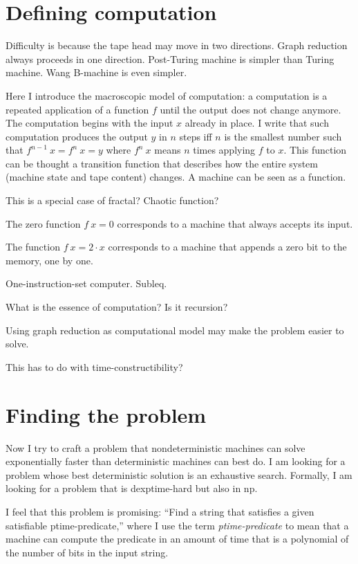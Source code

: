 \section{Defining computation}

Difficulty is because the tape head may move in two directions.
Graph reduction always proceeds in one direction.
Post-Turing machine is simpler than Turing machine.
Wang B-machine is even simpler.

Here I introduce the macroscopic model of computation:
a computation is a repeated application of a function $f$
until the output does not change anymore.
The computation begins with the input $x$ already in place.
I write that such computation produces the output $y$
in $n$ steps iff $n$ is the smallest number such that $f^{n-1}~x = f^n~x = y$
where $f^n~x$ means $n$ times applying $f$ to $x$.
This function can be thought a transition function that describes
how the entire system (machine state and tape content) changes.
A machine can be seen as a function.

This is a special case of fractal? Chaotic function?

The zero function $f~x = 0$ corresponds to a machine
that always accepts its input.

The function $f~x = 2 \cdot x$ corresponds to a machine
that appends a zero bit to the memory, one by one.

One-instruction-set computer.
Subleq.

What is the essence of computation?
Is it recursion?

Using graph reduction as computational model
may make the problem easier to solve.

This has to do with time-constructibility?

\section{Finding the problem}

Now I try to craft a problem that nondeterministic machines
can solve exponentially faster than deterministic machines can best do.
I am looking for a problem whose best deterministic solution
is an exhaustive search.
Formally, I am looking for a problem that is dexptime-hard but also in np.

I feel that this problem is promising:
``Find a string that satisfies a given satisfiable ptime-predicate,''
where I use the term \emph{ptime-predicate} to mean that
a machine can compute the predicate in an amount of time
that is a polynomial of the number of bits in the input string.

